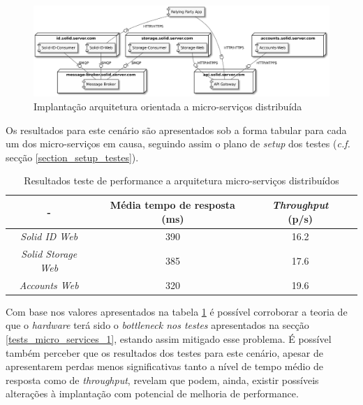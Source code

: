 \begin{figure}[H]
    \begin{center}
    \includegraphics[width=1 \textwidth]{figures/microservices_tests2.eps}
    \caption{Implantação arquitetura orientada a micro-serviços distribuída}
    \label{figure_solid_micro_services_multiples_vps_implantation_diagram}
    \end{center}
\end{figure}


Os resultados para este cenário são apresentados sob a forma tabular para cada um dos micro-serviços em causa, seguindo assim o plano de \emph{setup} dos testes (\emph{c.f.} secção \ref{section_setup_testes}).

\begin{table}[h]
\centering
\caption{Resultados teste de performance a arquitetura micro-serviços distribuídos}
\label{r_t_m_s_2}
\vspace{0.5cm}
\begin{tabular}{c|c|c|c} 
 - & Média tempo de resposta (ms) & \emph{Throughput} (p/s) \\
\hline                          
\emph{Solid ID Web} & 390 & 16.2 \\
\emph{Solid Storage Web} & 385 & 17.6 \\
\emph{Accounts Web} & 320 & 19.6 \\
\end{tabular}
\end{table}

Com base nos valores apresentados na tabela \ref{r_t_m_s_2} é possível corroborar a teoria de que o \emph{hardware} terá sido o \emph{bottleneck nos testes} apresentados na secção \ref{tests_micro_services_1}, estando assim mitigado esse problema. É possível também perceber que os resultados dos testes para este cenário, apesar de apresentarem perdas menos significativas tanto a nível de tempo médio de resposta como de \emph{throughput}, revelam que podem, ainda, existir possíveis alterações à implantação com potencial de melhoria de performance.

